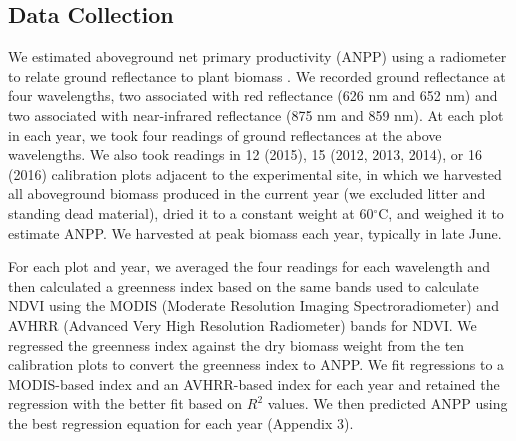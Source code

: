 \documentclass[fleqn,10pt,lineno]{wlpeerj} %
\begin{document}
\subsection{Data Collection}\label{data-collection}

We estimated aboveground net primary productivity (ANPP) using a
radiometer to relate ground reflectance to plant biomass \citep[see][
for a review]{Byrne2011}. We recorded ground reflectance at four
wavelengths, two associated with red reflectance (626 nm and 652 nm) and
two associated with near-infrared reflectance (875 nm and 859 nm). At
each plot in each year, we took four readings of ground reflectances at
the above wavelengths. We also took readings in 12 (2015), 15 (2012,
2013, 2014), or 16 (2016) calibration plots adjacent to the experimental
site, in which we harvested all aboveground biomass produced in the
current year (we excluded litter and standing dead material), dried it
to a constant weight at 60\(^{\circ}\)C, and weighed it to estimate
ANPP. We harvested at peak biomass each year, typically in late June.

For each plot and year, we averaged the four readings for each
wavelength and then calculated a greenness index based on the same bands
used to calculate NDVI using the MODIS (Moderate Resolution Imaging
Spectroradiometer) and AVHRR (Advanced Very High Resolution Radiometer)
bands for NDVI. We regressed the greenness index against the dry biomass
weight from the ten calibration plots to convert the greenness index to
ANPP. We fit regressions to a MODIS-based index and an AVHRR-based index
for each year and retained the regression with the better fit based on
\(R^2\) values. We then predicted ANPP using the best regression
equation for each year (Appendix 3).
\end{document}
